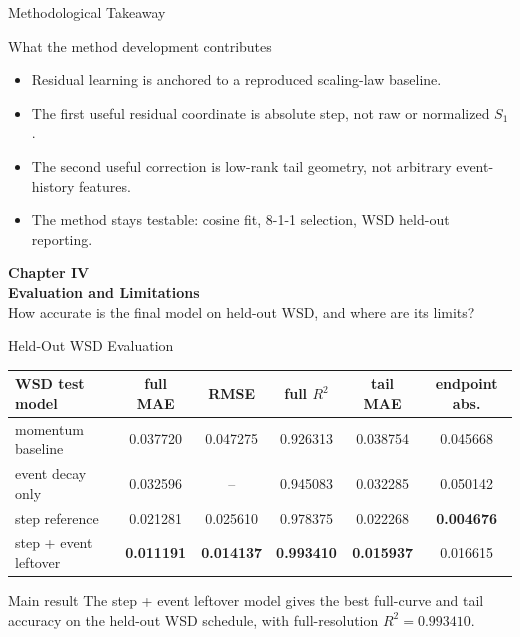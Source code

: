 \documentclass[fontset=fandol,aspectratio=169,10pt]{ctexbeamer}
\begin{document}
\begin{frame}{Methodological Takeaway}
  \begin{block}{What the method development contributes}
    \begin{itemize}
      \item Residual learning is anchored to a reproduced scaling-law baseline.
      \item The first useful residual coordinate is absolute step, not raw or normalized \(S_1\).
      \item The second useful correction is low-rank tail geometry, not arbitrary event-history features.
      \item The method stays testable: cosine fit, 8-1-1 selection, WSD held-out reporting.
    \end{itemize}
  \end{block}
\end{frame}

\begin{frame}[plain]
  \begin{center}
    \vspace{2.2em}
    {\Large\color{tdltBlue}\textbf{Chapter IV}}\\[0.5em]
    {\huge\textbf{Evaluation and Limitations}}\\[0.8em]
    \small How accurate is the final model on held-out WSD, and where are its limits?
  \end{center}
\end{frame}

\begin{frame}{Held-Out WSD Evaluation}
  \begin{table}
    \centering
    \scriptsize
    \begin{tabular}{lccccc}
      \toprule
      WSD test model & full MAE & RMSE & full \(R^2\) & tail MAE & endpoint abs.\\
      \midrule
      momentum baseline & 0.037720 & 0.047275 & 0.926313 & 0.038754 & 0.045668\\
      event decay only & 0.032596 & -- & 0.945083 & 0.032285 & 0.050142\\
      step reference & 0.021281 & 0.025610 & 0.978375 & 0.022268 & \textbf{0.004676}\\
      step + event leftover & \textbf{0.011191} & \textbf{0.014137} & \textbf{0.993410} & \textbf{0.015937} & 0.016615\\
      \bottomrule
    \end{tabular}
  \end{table}
  \begin{block}{Main result}
    The step + event leftover model gives the best full-curve and tail accuracy
    on the held-out WSD schedule, with full-resolution \(R^2=0.993410\).
  \end{block}
\end{frame}
\end{document}
